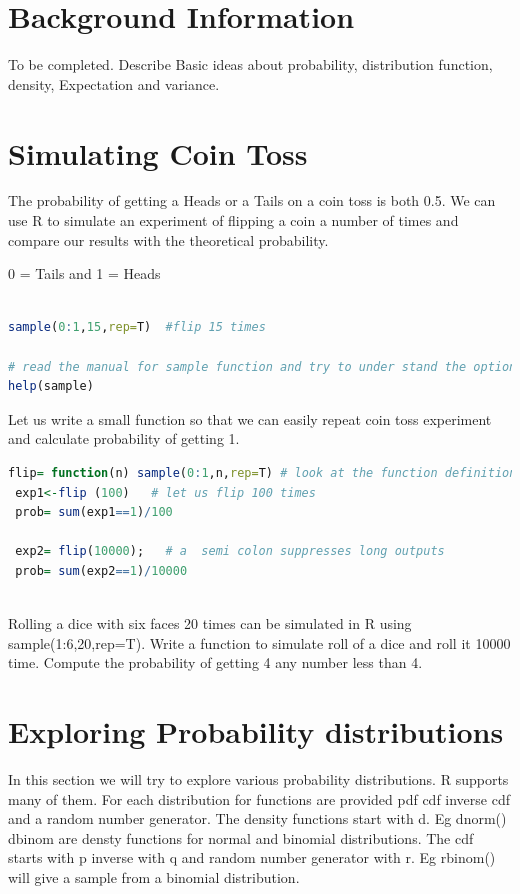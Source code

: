 \documentclass["../Applied_probabillity _and_statistics_lab_KTU.tex"]{subfiles}
\begin{document}
\section{Background Information}
  To be completed. Describe Basic ideas  about probability, distribution function, density, Expectation and  variance.
\section{Simulating Coin Toss}
 The probability of getting a Heads or a Tails on a coin toss is both 0.5.  We can use
R to simulate an experiment of flipping a coin a number of times and compare our results with
the theoretical probability.  

0 = Tails and 1 = Heads


\begin{lstlisting}[language=R]

sample(0:1,15,rep=T)  #flip 15 times
 
# read the manual for sample function and try to under stand the options.
help(sample) 
\end{lstlisting}

Let us write a small function so that we can easily repeat coin toss experiment and calculate probability of getting 1.
 \begin{lstlisting}[language=R]
 flip= function(n) sample(0:1,n,rep=T) # look at the function definition and the argument passing.
 exp1<-flip (100) 	# let us flip 100 times
 prob= sum(exp1==1)/100
 
 exp2= flip(10000);   # a  semi colon suppresses long outputs
 prob= sum(exp2==1)/10000
 
 \end{lstlisting}
 
 Rolling a dice with six faces 20 times can be simulated in R using 
 sample(1:6,20,rep=T).  Write a function to simulate roll of a dice and roll it 10000 time. Compute the probability of getting 4 any number less than 4.
 
 \section{Exploring Probability distributions}
  In this section we will try to explore various probability distributions. R supports many of them. For each distribution for functions are provided pdf cdf  inverse cdf  and a random number generator. 
  The density functions start with d. Eg dnorm() dbinom are densty functions for normal and binomial distributions. The cdf starts with p inverse with q and random number generator with r. Eg rbinom() will give a sample from a binomial distribution.
  
\end{document}
